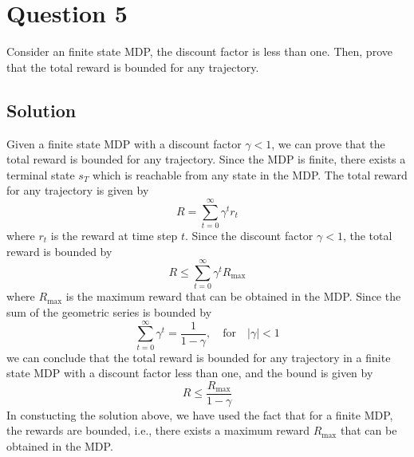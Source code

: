\section*{Question 5}

Consider an finite state MDP, the discount factor is less than one.
Then, prove that the total reward is bounded for any trajectory.

\subsection*{Solution}

Given a finite state MDP with a discount factor \( \gamma < 1 \), we can prove that the total reward is bounded for any trajectory.
Since the MDP is finite, there exists a terminal state \( s_T \) which is reachable from any state in the MDP.\@
The total reward for any trajectory is given by
\[
    R = \sum_{t=0}^{\infty} \gamma^t r_t
\]
where \( r_t \) is the reward at time step \( t \).
Since the discount factor \( \gamma < 1 \), the total reward is bounded by
\[
    R \leq \sum_{t=0}^{\infty} \gamma^t R_{\text{max}}
\]
where \( R_{\text{max}} \) is the maximum reward that can be obtained in the MDP.\@
Since the sum of the geometric series is bounded by
\[
    \sum_{t=0}^{\infty} \gamma^t = \frac{1}{1 - \gamma}, \quad \text{for} \quad \vert \gamma \vert < 1
\]
we can conclude that the total reward is bounded for any trajectory in a finite state MDP with a discount factor less than one, and the bound is given by
\[
    R \leq \frac{R_{\text{max}}}{1 - \gamma}
\]
In constucting the solution above, we have used the fact that for a finite MDP, the rewards are bounded, i.e., there exists a maximum reward \( R_{\text{max}} \) that can be obtained in the MDP.\@
